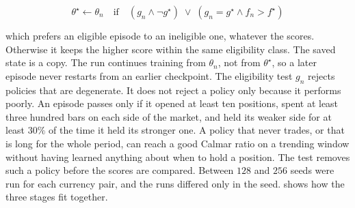 \begin{equation}
\theta^{\star} \leftarrow \theta_n \quad \text{if} \quad (g_n \wedge \neg g^{\star}) \;\vee\; \left(g_n = g^{\star} \wedge f_n > f^{\star}\right)
\label{Equation:KeepBest}
\end{equation}

which prefers an eligible episode to an ineligible one, whatever the scores. Otherwise it keeps the higher score within the same eligibility class. The saved state is a copy. The run continues training from $\theta_n$, not from $\theta^{\star}$, so a later episode never restarts from an earlier checkpoint. The eligibility test $g_n$ rejects policies that are degenerate. It does not reject a policy only because it performs poorly. An episode passes only if it opened at least ten positions, spent at least three hundred bars on each side of the market, and held its weaker side for at least $30\%$ of the time it held its stronger one. A policy that never trades, or that is long for the whole period, can reach a good Calmar ratio on a trending window without having learned anything about when to hold a position. The test removes such a policy before the scores are compared. Between $128$ and $256$ seeds were run for each currency pair, and the runs differed only in the seed.  shows how the three stages fit together.

